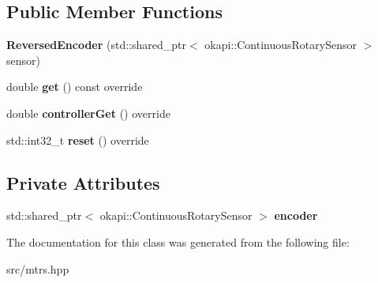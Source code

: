 \subsection*{Public Member Functions}
\begin{DoxyCompactItemize}
\item 
\mbox{\label{classReversedEncoder_a06e957ec803cac9964921f19d003fa43}} 
{\bfseries Reversed\+Encoder} (std\+::shared\+\_\+ptr$<$ okapi\+::\+Continuous\+Rotary\+Sensor $>$ sensor)
\item 
\mbox{\label{classReversedEncoder_a528b2fd3d24d1a68a6374d9e957315b3}} 
double {\bfseries get} () const override
\item 
\mbox{\label{classReversedEncoder_a3b33e15d1282f03e6adf3cbbaf81d1d1}} 
double {\bfseries controller\+Get} () override
\item 
\mbox{\label{classReversedEncoder_ae13ab8af5aebbb48a09ed63ce7bdfeaa}} 
std\+::int32\+\_\+t {\bfseries reset} () override
\end{DoxyCompactItemize}
\subsection*{Private Attributes}
\begin{DoxyCompactItemize}
\item 
\mbox{\label{classReversedEncoder_a8b176cecab772e61977b1b733e77d5c9}} 
std\+::shared\+\_\+ptr$<$ okapi\+::\+Continuous\+Rotary\+Sensor $>$ {\bfseries encoder}
\end{DoxyCompactItemize}


The documentation for this class was generated from the following file\+:\begin{DoxyCompactItemize}
\item 
src/mtrs.\+hpp\end{DoxyCompactItemize}
